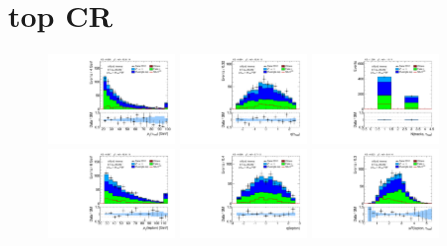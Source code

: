 \clearpage

\section{top CR}

\begin{figure}[tp]
  \centering
  \includegraphics[width=0.30\textwidth]{figures/analysis/vbf-topCR/tau-pt}
  \includegraphics[width=0.30\textwidth]{figures/analysis/vbf-topCR/tau-eta}
  \includegraphics[width=0.30\textwidth]{figures/analysis/vbf-topCR/tau-numTrack} \\
  \includegraphics[width=0.30\textwidth]{figures/analysis/vbf-topCR/lep-pt-hi}
  \includegraphics[width=0.30\textwidth]{figures/analysis/vbf-topCR/lep-eta}
  \includegraphics[width=0.30\textwidth]{figures/analysis/vbf-topCR/taulep-dR} \\

\end{figure}
